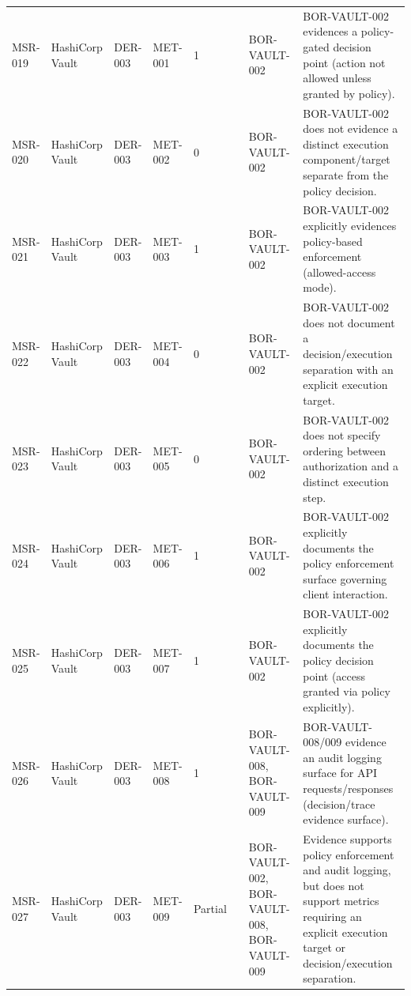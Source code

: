 \documentclass{article}
\begin{document}
\begin{longtable}{@{}p{}p{}p{}p{}p{}p{}p{}p{}@{}}
MSR-019 & HashiCorp Vault & DER-003 & MET-001 & 1 &  & BOR-VAULT-002 & BOR-VAULT-002 evidences a policy-gated decision point (action not allowed unless granted by policy).\\
MSR-020 & HashiCorp Vault & DER-003 & MET-002 & 0 &  & BOR-VAULT-002 & BOR-VAULT-002 does not evidence a distinct execution component/target separate from the policy decision.\\
MSR-021 & HashiCorp Vault & DER-003 & MET-003 & 1 &  & BOR-VAULT-002 & BOR-VAULT-002 explicitly evidences policy-based enforcement (allowed-access mode).\\
MSR-022 & HashiCorp Vault & DER-003 & MET-004 & 0 &  & BOR-VAULT-002 & BOR-VAULT-002 does not document a decision/execution separation with an explicit execution target.\\
MSR-023 & HashiCorp Vault & DER-003 & MET-005 & 0 &  & BOR-VAULT-002 & BOR-VAULT-002 does not specify ordering between authorization and a distinct execution step.\\
MSR-024 & HashiCorp Vault & DER-003 & MET-006 & 1 &  & BOR-VAULT-002 & BOR-VAULT-002 explicitly documents the policy enforcement surface governing client interaction.\\
MSR-025 & HashiCorp Vault & DER-003 & MET-007 & 1 &  & BOR-VAULT-002 & BOR-VAULT-002 explicitly documents the policy decision point (access granted via policy explicitly).\\
MSR-026 & HashiCorp Vault & DER-003 & MET-008 & 1 &  & BOR-VAULT-008, BOR-VAULT-009 & BOR-VAULT-008/009 evidence an audit logging surface for API requests/responses (decision/trace evidence surface).\\
MSR-027 & HashiCorp Vault & DER-003 & MET-009 & Partial &  & BOR-VAULT-002, BOR-VAULT-008, BOR-VAULT-009 & Evidence supports policy enforcement and audit logging, but does not support metrics requiring an explicit execution target or decision/execution separation.\\


\end{longtable}
\end{document}
